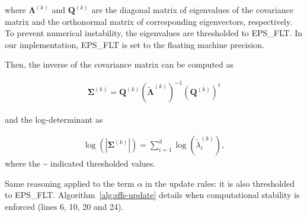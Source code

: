 \documentclass[journal]{IEEEtran}
\begin{document}
    where  $\boldsymbol{\Lambda}^{(k)}$ and  $\mathbf{Q}^{(k)}$ are  the
    diagonal matrix  of eigenvalues of  the covariance matrix  and the
    orthonormal matrix of corresponding eigenvectors, respectively. To
    prevent numerical instability, the  eigenvalues are thresholded to
    EPS\_FLT. In our  implementation, EPS\_FLT is set  to the floating
    machine precision.

    Then, the inverse of the covariance matrix can be computed as

    \begin{eqnarray}
      \boldsymbol{\Sigma}^{(k)} = \mathbf{Q}^{(k)} (\tilde{\boldsymbol{\Lambda}}^{(k)})^{-1} (\mathbf{Q}^{(k)})^t\label{eq:eigendecomp:inv}
    \end{eqnarray}

    and the log-determinant as

    \begin{eqnarray}
      \label{eq:log:det}
      \log \left(|\boldsymbol{\Sigma}^{(k)}|\right) = \sum_{i=1}^d\log(\tilde{\lambda}_i^{(k)}),
    \end{eqnarray}
    where the \textasciitilde{} indicated thresholded values.

    Same reasoning applied  to the term $\alpha$ in  the update rules:
    it       is       also        thresholded       to       EPS\_FLT.
    Algorithm~\ref{alg:sffs-update}    details   when    computational
    stability is enforced (lines 6, 10, 20 and 24).
\end{document}
